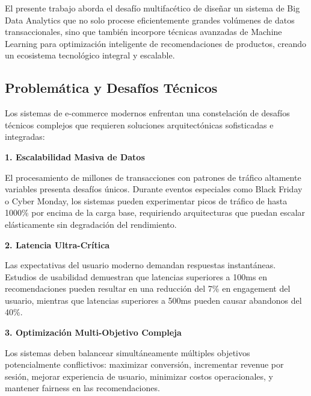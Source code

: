 \documentclass[conference,10pt,letterpaper]{IEEEtran}
\begin{document}
El presente trabajo aborda el desafío multifacético de diseñar un sistema de Big Data Analytics que no solo procese eficientemente grandes volúmenes de datos transaccionales, sino que también incorpore técnicas avanzadas de Machine Learning para optimización inteligente de recomendaciones de productos, creando un ecosistema tecnológico integral y escalable.

\subsection{Problemática y Desafíos Técnicos}
\label{subsec:problematica}

Los sistemas de e-commerce modernos enfrentan una constelación de desafíos técnicos complejos que requieren soluciones arquitectónicas sofisticadas e integradas:

\vspace{0.2cm}

\textbf{1. Escalabilidad Masiva de Datos}

El procesamiento de millones de transacciones con patrones de tráfico altamente variables presenta desafíos únicos. Durante eventos especiales como Black Friday o Cyber Monday, los sistemas pueden experimentar picos de tráfico de hasta 1000\% por encima de la carga base, requiriendo arquitecturas que puedan escalar elásticamente sin degradación del rendimiento.

\vspace{0.2cm}

\textbf{2. Latencia Ultra-Crítica}

Las expectativas del usuario moderno demandan respuestas instantáneas. Estudios de usabilidad demuestran que latencias superiores a 100ms en recomendaciones pueden resultar en una reducción del 7\% en engagement del usuario, mientras que latencias superiores a 500ms pueden causar abandonos del 40\%.

\vspace{0.2cm}

\textbf{3. Optimización Multi-Objetivo Compleja}

Los sistemas deben balancear simultáneamente múltiples objetivos potencialmente conflictivos: maximizar conversión, incrementar revenue por sesión, mejorar experiencia de usuario, minimizar costos operacionales, y mantener fairness en las recomendaciones.

\vspace{0.2cm}
\end{document}
